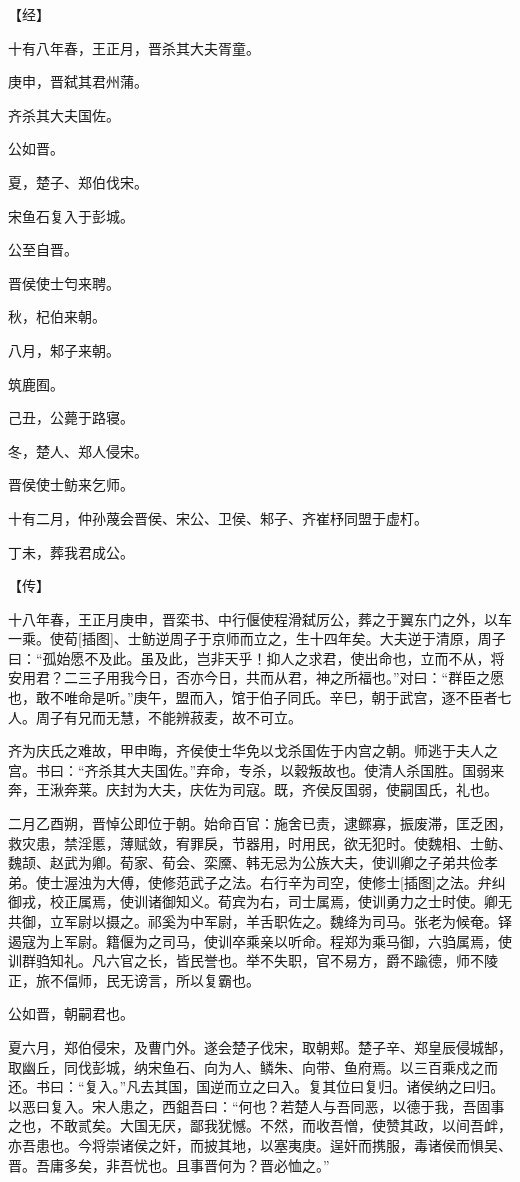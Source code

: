 \documentclass[a4paper,12pt,UTF8,twoside]{ctexbook}
\begin{document}
【经】

十有八年春，王正月，晋杀其大夫胥童。

庚申，晋弑其君州蒲。

齐杀其大夫国佐。

公如晋。

夏，楚子、郑伯伐宋。

宋鱼石复入于彭城。

公至自晋。

晋侯使士匄来聘。

秋，杞伯来朝。

八月，邾子来朝。

筑鹿囿。

己丑，公薨于路寝。

冬，楚人、郑人侵宋。

晋侯使士鲂来乞师。

十有二月，仲孙蔑会晋侯、宋公、卫侯、邾子、齐崔杼同盟于虚朾。

丁未，葬我君成公。

【传】

十八年春，王正月庚申，晋栾书、中行偃使程滑弑厉公，葬之于翼东门之外，以车一乘。使荀[插图]、士鲂逆周子于京师而立之，生十四年矣。大夫逆于清原，周子曰：“孤始愿不及此。虽及此，岂非天乎！抑人之求君，使出命也，立而不从，将安用君？二三子用我今日，否亦今日，共而从君，神之所福也。”对曰：“群臣之愿也，敢不唯命是听。”庚午，盟而入，馆于伯子同氏。辛巳，朝于武宫，逐不臣者七人。周子有兄而无慧，不能辨菽麦，故不可立。

齐为庆氏之难故，甲申晦，齐侯使士华免以戈杀国佐于内宫之朝。师逃于夫人之宫。书曰：“齐杀其大夫国佐。”弃命，专杀，以穀叛故也。使清人杀国胜。国弱来奔，王湫奔莱。庆封为大夫，庆佐为司寇。既，齐侯反国弱，使嗣国氏，礼也。

二月乙酉朔，晋悼公即位于朝。始命百官：施舍已责，逮鳏寡，振废滞，匡乏困，救灾患，禁淫慝，薄赋敛，宥罪戾，节器用，时用民，欲无犯时。使魏相、士鲂、魏颉、赵武为卿。荀家、荀会、栾黡、韩无忌为公族大夫，使训卿之子弟共俭孝弟。使士渥浊为大傅，使修范武子之法。右行辛为司空，使修士[插图]之法。弁纠御戎，校正属焉，使训诸御知义。荀宾为右，司士属焉，使训勇力之士时使。卿无共御，立军尉以摄之。祁奚为中军尉，羊舌职佐之。魏绛为司马。张老为候奄。铎遏寇为上军尉。籍偃为之司马，使训卒乘亲以听命。程郑为乘马御，六驺属焉，使训群驺知礼。凡六官之长，皆民誉也。举不失职，官不易方，爵不踰德，师不陵正，旅不偪师，民无谤言，所以复霸也。

公如晋，朝嗣君也。

夏六月，郑伯侵宋，及曹门外。遂会楚子伐宋，取朝郏。楚子辛、郑皇辰侵城郜，取幽丘，同伐彭城，纳宋鱼石、向为人、鳞朱、向带、鱼府焉。以三百乘戍之而还。书曰：“复入。”凡去其国，国逆而立之曰入。复其位曰复归。诸侯纳之曰归。以恶曰复入。宋人患之，西鉏吾曰：“何也？若楚人与吾同恶，以德于我，吾固事之也，不敢贰矣。大国无厌，鄙我犹憾。不然，而收吾憎，使赞其政，以间吾衅，亦吾患也。今将崇诸侯之奸，而披其地，以塞夷庚。逞奸而携服，毒诸侯而惧吴、晋。吾庸多矣，非吾忧也。且事晋何为？晋必恤之。”
\end{document}
